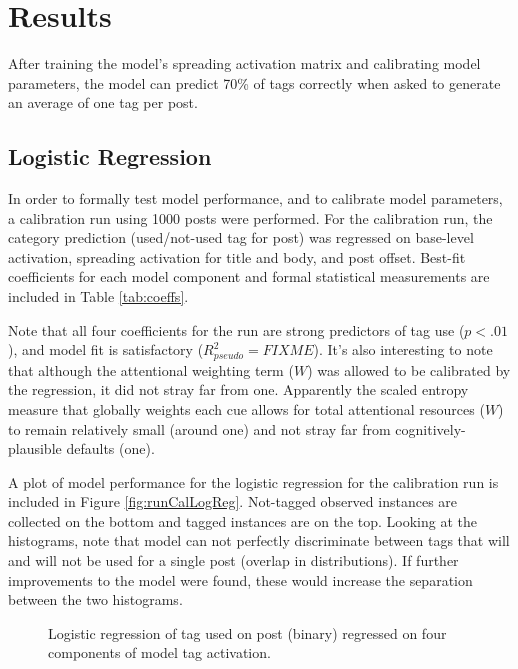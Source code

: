 \documentclass[10pt,letterpaper]{article}
\begin{document}
\section{Results}

After training the model's spreading activation matrix and calibrating model parameters, the model can predict 70\% of tags correctly when asked to generate an average of one tag per post.

\subsection{Logistic Regression}

In order to formally test model performance, and to calibrate model parameters, a calibration run using \num{1000} posts were performed.
For the calibration run, the category prediction (used/not-used tag for post) was regressed on base-level activation, spreading activation for title and body, and post offset.
Best-fit coefficients for each model component and formal statistical measurements are included in Table \ref{tab:coeffs}.

Note that all four coefficients for the run are strong predictors of tag use ($p<.01$), and model fit is satisfactory ($R_{pseudo}^{2}=FIXME$).
It's also interesting to note that although the attentional weighting term ($W$) was allowed to be calibrated by the regression, it did not stray far from one.
Apparently the scaled entropy measure that globally weights each cue allows for total attentional resources ($W$) to remain relatively small (around one) and not stray far from cognitively-plausible defaults (one).

A plot of model performance for the logistic regression for the calibration run is included in Figure \ref{fig:runCalLogReg}.
Not-tagged observed instances are collected on the bottom and tagged instances are on the top.
Looking at the histograms, note that model can not perfectly discriminate between tags that will and will not be used for a single post (overlap in distributions).
If further improvements to the model were found, these would increase the separation between the two histograms.

\begin{figure}[ht]
  \centering
  \caption{
    Logistic regression of tag used on post (binary) regressed on four components of model tag activation.
  }
  \label{fig:logReg}
\end{figure}
\end{document}
